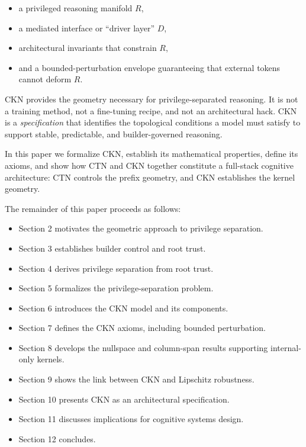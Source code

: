 \documentclass[11pt,a4paper]{article}
\begin{document}
\begin{itemize}
    \item a privileged reasoning manifold $R$,
    \item a mediated interface or ``driver layer'' $D$,
    \item architectural invariants that constrain $R$,
    \item and a bounded-perturbation envelope guaranteeing that external tokens cannot deform $R$.
\end{itemize}

CKN provides the geometry necessary for privilege-separated reasoning. It is not a training method, not a fine-tuning recipe, and not an architectural hack. CKN is a \emph{specification} that identifies the topological conditions a model must satisfy to support stable, predictable, and builder-governed reasoning.

In this paper we formalize CKN, establish its mathematical properties, define its axioms, and show how CTN and CKN together constitute a full-stack cognitive architecture: CTN controls the prefix geometry, and CKN establishes the kernel geometry.

The remainder of this paper proceeds as follows:
\begin{itemize}
    \item Section 2 motivates the geometric approach to privilege separation.
    \item Section 3 establishes builder control and root trust.
    \item Section 4 derives privilege separation from root trust.
    \item Section 5 formalizes the privilege-separation problem.
    \item Section 6 introduces the CKN model and its components.
    \item Section 7 defines the CKN axioms, including bounded perturbation.
    \item Section 8 develops the nullspace and column-span results supporting internal-only kernels.
    \item Section 9 shows the link between CKN and Lipschitz robustness.
    \item Section 10 presents CKN as an architectural specification.
    \item Section 11 discusses implications for cognitive systems design.
    \item Section 12 concludes.
\end{itemize}
\end{document}
